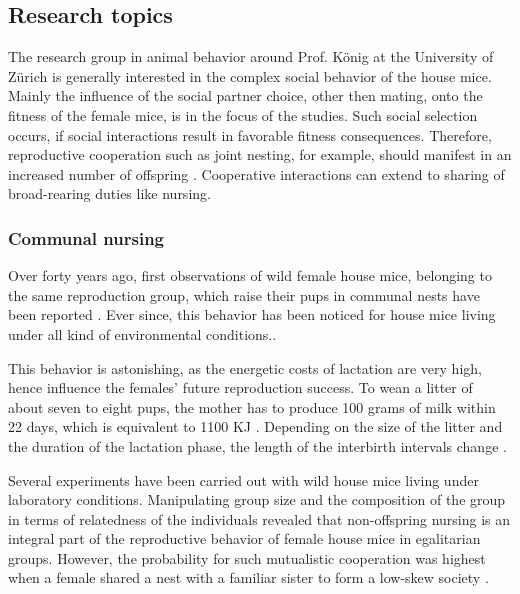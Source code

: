\subsection{Research topics}
\label{subsec:researchtopics}

The research group in animal behavior around Prof. K\"onig at the University of Z\"urich is generally interested in the complex social behavior of the house mice. Mainly the influence of the social partner choice, other then mating, onto the fitness of the female mice, is in the focus of the studies. Such social selection occurs, if social interactions result in favorable fitness consequences. Therefore, reproductive cooperation such as joint nesting, for example, should manifest in an increased number of offspring \cite{weidt:07}. Cooperative interactions can extend to sharing of broad-rearing duties like nursing.

\subsubsection{Communal nursing}
\label{subsubsec:comnurs}

Over forty years ago, first observations of wild female house mice, belonging to the same reproduction group, which raise their pups in communal nests have been reported \cite{southwick:55}. Ever since, this behavior has been noticed for house mice living under all kind of environmental conditions.\cite{crowcroft:63, sayler:69, gandelman:70, werboff:70, baker:81}.

This behavior is astonishing, as the energetic costs of lactation are very high, hence influence the females' future reproduction success. To wean a litter of about seven to eight pups, the mother has to produce 100 grams of milk within 22 days, which is equivalent to 1100 \acf{KJ} \cite{koenig:88}. Depending on the size of the litter and the duration of the lactation phase, the length of the interbirth intervals change \cite{fuchs:81, fuchs:82, koenig:87a, koenig:87b}.

Several experiments have been carried out with wild house mice living under laboratory conditions. Manipulating group size and the composition of the group in terms of relatedness of the individuals revealed that non-offspring nursing is an integral part of the reproductive behavior of female house mice in egalitarian groups. However, the probability for such mutualistic cooperation was highest when a female shared a nest with a familiar sister to form a low-skew society \cite{koenig:06}.

